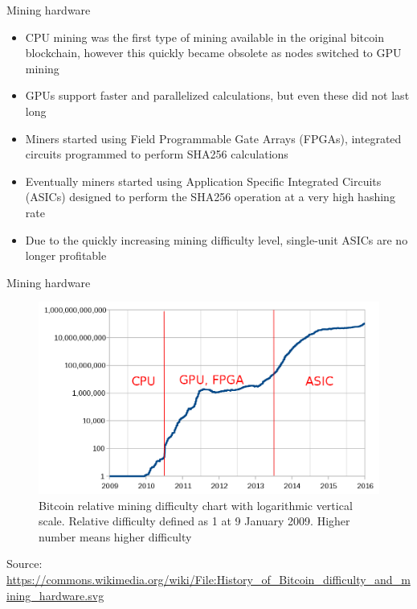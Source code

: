 \documentclass[9pt]{beamer}
\begin{document}

\begin{frame}{Mining hardware}
	\begin{itemize}
		\item CPU mining was the first type of mining available in the original bitcoin blockchain, however this quickly became obsolete as nodes switched to GPU mining
		\item GPUs support faster and parallelized calculations, but even these did not last long
		\item Miners started using Field Programmable Gate Arrays (FPGAs), integrated circuits programmed to perform SHA256 calculations
		\item Eventually miners started using Application Specific Integrated Circuits (ASICs) designed to perform the SHA256 operation at a very high hashing rate
		\item Due to the quickly increasing mining difficulty level, single-unit ASICs are no longer profitable
	\end{itemize}
\end{frame}


\begin{frame}{Mining hardware}
	\begin{figure}[]
		\centering
		\includegraphics  [scale=0.2]{Images/hardware}
		\caption{Bitcoin relative mining difficulty chart with logarithmic vertical scale. Relative difficulty defined as 1 at 9 January 2009. Higher number means higher difficulty}
	\end{figure}
	\begin{tiny}
		Source: \href{https://commons.wikimedia.org/wiki/File:History_of_Bitcoin_difficulty_and_mining_hardware.svg}{https://commons.wikimedia.org/wiki/File:History\_of\_Bitcoin\_difficulty\_and\_mining\_hardware.svg}
	\end{tiny}
\end{frame}
\end{document}
